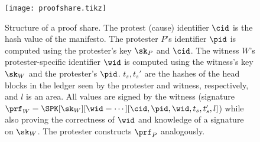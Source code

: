 \begin{figure}
  \centering
  \small
  \texttt{[image: proofshare.tikz]}
  \caption{%
    Structure of a proof share.
    The protest (cause) identifier \(\cid\) is the hash value of the manifesto.
    The protester \(P\)'s identifier \(\pid\) is computed using the protester's key \(\sk_P\) and \(\cid\).
    The witness \(W\)'s protester-specific identifier \(\wid\) is computed using the
    witness's key \(\sk_W\) and the protester's \(\pid\).
    \(t_s, t_s'\) are the hashes of the head blocks in the ledger seen by the 
    protester and witness, respectively, and \(l\) is an area.
    All values are signed by the witness (signature \(\prf_W = \SPK[\sk_W][\wid 
      = \dotsb][\cid, \pid, \wid, t_s, t_s', l]\)) while also proving the 
    correctness of \(\wid\) and knowledge of a signature on \(\sk_W\).
    The protester constructs \(\prf_P\) analogously.
  }%
  \label{fig:ProofFig}
\end{figure}%

